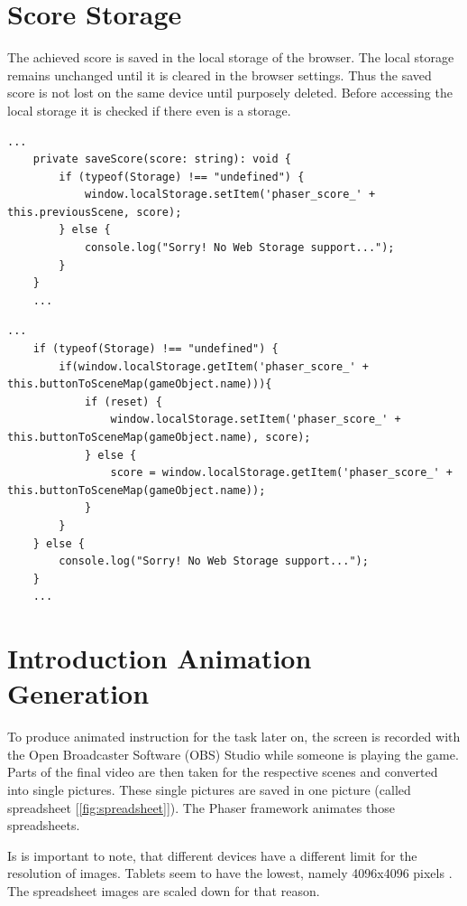 \section{Score Storage}\label{sec:scorestorage}
The achieved score is saved in the local storage of the browser.
The local storage remains unchanged until it is cleared in the browser settings.
Thus the saved score is not lost on the same device until purposely deleted.
Before accessing the local storage it is checked if there even is a storage.

\begin{lstlisting}[style=TypeScript, caption={Storage access (scoreScene.ts)}]
    ...
    private saveScore(score: string): void {
        if (typeof(Storage) !== "undefined") {
            window.localStorage.setItem('phaser_score_' + this.previousScene, score);
        } else {
            console.log("Sorry! No Web Storage support...");
        }
    }
    ...
\end{lstlisting}

\begin{lstlisting}[style=TypeScript, caption={Storage access (levelMenuScene.ts)}]
    ...
    if (typeof(Storage) !== "undefined") {
        if(window.localStorage.getItem('phaser_score_' + this.buttonToSceneMap(gameObject.name))){
            if (reset) {
                window.localStorage.setItem('phaser_score_' + this.buttonToSceneMap(gameObject.name), score);
            } else {
                score = window.localStorage.getItem('phaser_score_' + this.buttonToSceneMap(gameObject.name));
            }
        }
    } else {
        console.log("Sorry! No Web Storage support...");
    }
    ...
\end{lstlisting}

\section{Introduction Animation Generation}\label{sec:introduction-animation-generation}
To produce animated instruction for the task later on,
the screen is recorded with the Open Broadcaster Software (OBS) Studio \cite{obs} while someone is playing the game.
Parts of the final video are then taken for the respective scenes and converted into single pictures.
These single pictures are saved in one picture (called spreadsheet [\ref{fig:spreadsheet}]).
The Phaser framework animates those spreadsheets.

Is is important to note, that different devices have a different limit for the resolution of images.
Tablets seem to have the lowest, namely 4096x4096 pixels \cite{webglmaxtexturesize}.
The spreadsheet images are scaled down for that reason.

